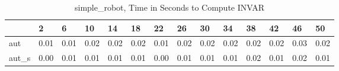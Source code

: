 \begin{table}
\caption{simple_robot, Time in Seconds to Compute INVAR}
\label{simple_robot_INVAR_time}
\begin{tabular}{llllllllllllll}
\toprule
 & 2 & 6 & 10 & 14 & 18 & 22 & 26 & 30 & 34 & 38 & 42 & 46 & 50 \\
\midrule
aut & 0.01 & 0.01 & 0.02 & 0.02 & 0.02 & 0.01 & 0.02 & 0.02 & 0.02 & 0.02 & 0.02 & 0.03 & 0.02 \\
aut_s & 0.00 & 0.01 & 0.01 & 0.01 & 0.01 & 0.00 & 0.01 & 0.01 & 0.01 & 0.02 & 0.01 & 0.02 & 0.01 \\
\bottomrule
\end{tabular}
\end{table}
